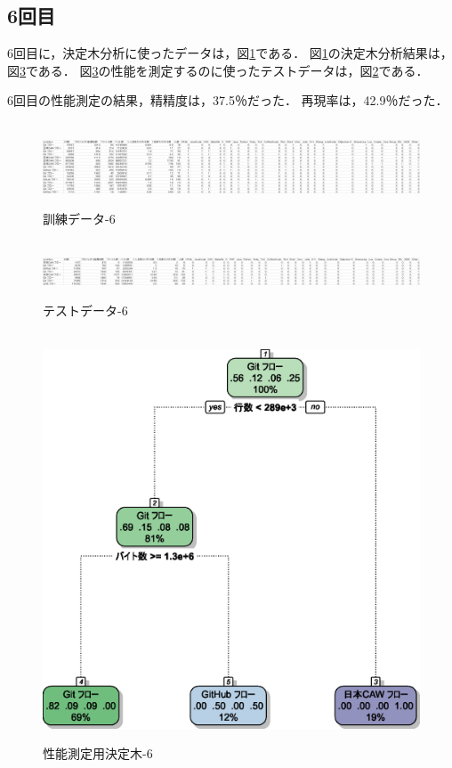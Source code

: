 \subsection{6回目}
6回目に，決定木分析に使ったデータは，図\ref{データ6-1}である．
図\ref{データ6-1}の決定木分析結果は，図\ref{決定木6}である．
図\ref{決定木6}の性能を測定するのに使ったテストデータは，図\ref{データ6-2}である．

6回目の性能測定の結果，精精度は，37.5％だった．
再現率は，42.9％だった．

\begin{figure}[H]
\centering　
\includegraphics[width=13cm]{6-1.png}
\caption{訓練データ-6}\label{データ6-1}
\end{figure}
\begin{figure}[H]
\centering　
\includegraphics[width=13cm]{6-2.png}
\caption{テストデータ-6}\label{データ6-2}
\end{figure}
\begin{figure}[H]
\centering　
\includegraphics[width=13cm]{6.eps}
\caption{性能測定用決定木-6}\label{決定木6}
\end{figure}


